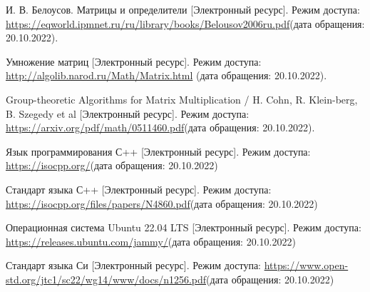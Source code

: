 \renewcommand{\bibname}{Список использованных источников}

\begin{thebibliography}{10}
	И. В. Белоусов. Матрицы и определители [Электронный ресурс]. Режим доступа:
	\url{https://eqworld.ipmnet.ru/ru/library/books/Belousov2006ru.pdf}(дата обращения: 20.10.2022).
	
	Умножение матриц [Электронный ресурс]. Режим доступа: 
	\url{http://algolib.narod.ru/Math/Matrix.html} (дата обращения: 20.10.2022).
	
	Group-theoretic Algorithms for Matrix Multiplication / H. Cohn, R. Klein-berg, B. Szegedy et al [Электронный ресурс]. Режим доступа: 
	\url{https://arxiv.org/pdf/math/0511460.pdf}(дата обращения: 20.10.2022).
	
	Язык программирования С++ [Электронный ресурс]. Режим доступа: 
	\url{https://isocpp.org/}(дата обращения: 20.10.2022)
	
	Стандарт языка С++ [Электронный ресурс]. Режим доступа:
	\url{https://isocpp.org/files/papers/N4860.pdf}(дата обращения: 20.10.2022) 
	
	Операционная система Ubuntu 22.04 LTS [Электронный ресурс]. Режим доступа: 
	\url{https://releases.ubuntu.com/jammy/}(дата обращения: 20.10.2022)
	
	Стандарт языка Си [Электронный ресурс]. Режим доступа: 
	\url{https://www.open-std.org/jtc1/sc22/wg14/www/docs/n1256.pdf}(дата обращения: 20.10.2022) 
	
	
	
\end{thebibliography}





